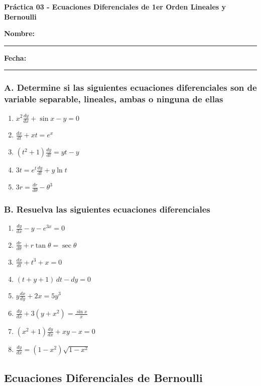 \documentclass[a4paper,12pt]{article}
\begin{document}
\begin{center}
    \Large\textbf{Práctica 03 - Ecuaciones Diferenciales de 1er Orden Lineales y Bernoulli}\\[0.5cm]  

\end{center}
  \textbf{Nombre:} \rule{9cm}{0.4pt}  \textbf{Fecha:} \rule{4.5cm}{0.4pt}


\subsubsection*{A. Determine si las siguientes ecuaciones diferenciales son de variable separable, lineales, ambas o ninguna de ellas}

\begin{enumerate}
    \item \(x^2 \frac{dy}{dx} + \sin x - y = 0\)
    \item \(\frac{dx}{dt} + xt = e^x\)
    \item \((t^2 + 1) \frac{dy}{dt} = yt - y\)
    \item \(3t = e^t \frac{dy}{dt} + y \ln t\)
    \item \(3r = \frac{dr}{d\theta} - \theta^3\)
\end{enumerate}

\subsubsection*{B. Resuelva las siguientes ecuaciones diferenciales}

\begin{enumerate}
    \item \(\frac{dy}{dx} - y - e^{3x} = 0\)
    \item \(\frac{dr}{d\theta} + r \tan \theta = \sec \theta\)
    \item \(\frac{dx}{dt} + t^3 + x = 0\)
    \item \((t + y + 1) \, dt - dy = 0\)
    \item \(y \frac{dx}{dy} + 2x = 5y^3\)
    \item \(\frac{dy}{dx} + 3(y + x^2) = \frac{\sin x}{x}\)
    \item \((x^2 + 1) \frac{dy}{dx} + xy - x = 0\)
    \item \(\frac{dy}{dx} = \left(1 - x^2 \right) \sqrt{1 - x^2}\)
\end{enumerate}

\subsection*{Ecuaciones Diferenciales de Bernoulli}
\end{document}
